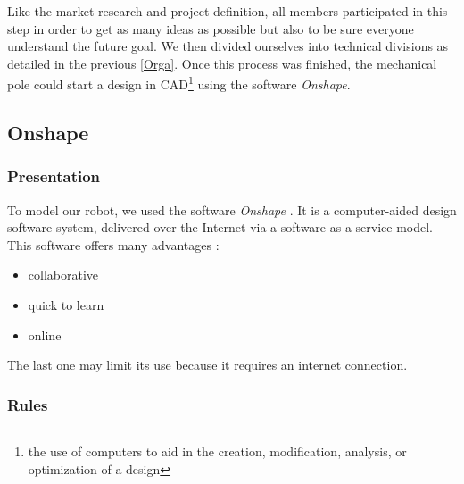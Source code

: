 Like the market research and project definition, all members participated in this step in order to get as many ideas as possible but also to be sure everyone understand the future goal. We then divided ourselves into technical divisions as detailed in the previous \ref{Orga}. Once this process was finished, the mechanical pole could start a design in \gls{CAD}\footnote{the use of computers to aid in the creation, modification, analysis, or optimization of a design} using the software \textit{Onshape}.

\subsection{Onshape}
\label{Ons}
\subsubsection{Presentation}

To model our robot, we used the software \textit{Onshape} \cite{Onshape}. It is a computer-aided design software system, delivered over the Internet via a software-as-a-service model. This software offers many advantages : 
\begin{itemize}[noitemsep]
    \item collaborative
    \item quick to learn
    \item online
\end{itemize}

The last one may limit its use because it requires an internet connection.

\subsubsection{Rules}

